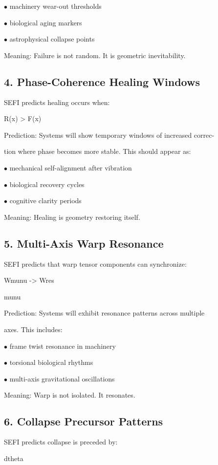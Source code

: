 \documentclass[10pt]{article}
\begin{document}
\noindent $\bullet$ machinery wear-out thresholds

\noindent $\bullet$ biological aging markers

\noindent $\bullet$ astrophysical collapse points

Meaning: Failure is not random. It is geometric inevitability.

\subsection*{4. Phase-Coherence Healing Windows}
SEFI predicts healing occurs when:

R(x) > F(x)

Prediction: Systems will show temporary windows of increased correc-

tion where phase becomes more stable. This should appear as:


\noindent $\bullet$ mechanical self-alignment after vibration

\noindent $\bullet$ biological recovery cycles

\noindent $\bullet$ cognitive clarity periods

Meaning: Healing is geometry restoring itself.

\subsection*{5. Multi-Axis Warp Resonance}
SEFI predicts that warp tensor components can synchronize:

Wmunu -> Wres

munu

Prediction: Systems will exhibit resonance patterns across multiple

axes. This includes:

\noindent $\bullet$ frame twist resonance in machinery

\noindent $\bullet$ torsional biological rhythms

\noindent $\bullet$ multi-axis gravitational oscillations

Meaning: Warp is not isolated. It resonates.

\subsection*{6. Collapse Precursor Patterns}
SEFI predicts collapse is preceded by:

dtheta
\end{document}
